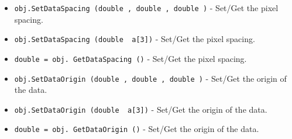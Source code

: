 \begin{itemize}
\item  \verb|obj.SetDataSpacing (double , double , double )| -  Set/Get the pixel spacing.

\item  \verb|obj.SetDataSpacing (double  a[3])| -  Set/Get the pixel spacing.

\item  \verb|double = obj. GetDataSpacing ()| -  Set/Get the pixel spacing.

\item  \verb|obj.SetDataOrigin (double , double , double )| -  Set/Get the origin of the data.

\item  \verb|obj.SetDataOrigin (double  a[3])| -  Set/Get the origin of the data.

\item  \verb|double = obj. GetDataOrigin ()| -  Set/Get the origin of the data.

\end{itemize}

